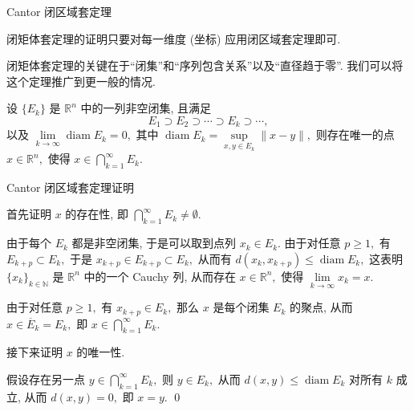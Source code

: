 
\begin{frame}{Cantor 闭区域套定理}


闭矩体套定理的证明只要对每一维度 (坐标) 应用闭区域套定理即可.

\pause
\vspace{1em}

闭矩体套定理的关键在于``闭集''和``序列包含关系''以及``直径趋于零''. 我们可以将这个定理推广到更一般的情况.

\pause
\vspace{1em}

\begin{thm}
设 $\{ E_k \}$ 是 $\mathbb{R}^n$ 中的一列非空闭集, 且满足
\[E_1 \supset E_2 \supset \cdots \supset E_k \supset \cdots,\]
以及 $\lim\limits_{k\to\infty} \operatorname{diam} E_k = 0,$ 其中 $\operatorname{diam} E_k = \sup\limits_{x, y \in E_k} \lVert x - y \rVert,$ 则存在唯一的点 $x \in \mathbb{R}^n,$ 使得 $x \in \bigcap\limits_{k=1}^{\infty} E_k.$
\end{thm}

\end{frame}


\begin{frame}{Cantor 闭区域套定理证明}

首先证明 $x$ 的存在性, 即 $\bigcap\limits_{k=1}^{\infty} E_k \neq \emptyset.$

\pause

由于每个 $E_k$ 都是非空闭集, 于是可以取到点列 $x_k \in E_k.$ 由于对任意 $p \geqslant 1,$ 有 $E_{k+p} \subset E_k,$
于是 $x_{k+p} \in E_{k+p} \subset E_k,$ 从而有 $d(x_k, x_{k+p}) \leqslant \operatorname{diam} E_k,$
这表明 $\{ x_k \}_{k\in\mathbb{N}}$ 是 $\mathbb{R}^n$ 中的一个 Cauchy 列, 从而存在 $x \in \mathbb{R}^n,$ 使得 $\lim\limits_{k\to\infty} x_k = x.$

\pause

由于对任意 $p \geqslant 1,$ 有 $x_{k+p} \in E_k,$ 那么 $x$ 是每个闭集 $E_k$ 的聚点,
从而 $x \in \overline{E}_k = E_k,$ 即 $x \in \bigcap\limits_{k=1}^{\infty} E_k.$

\pause
\vspace{1em}

接下来证明 $x$ 的唯一性.

\pause

假设存在另一点 $y \in \bigcap\limits_{k=1}^{\infty} E_k,$ 则 $y \in E_k,$
从而 $d(x, y) \leqslant \operatorname{diam} E_k$ 对所有 $k$ 成立, 从而 $d(x, y) = 0,$ 即 $x = y.$
\qed

\end{frame}

